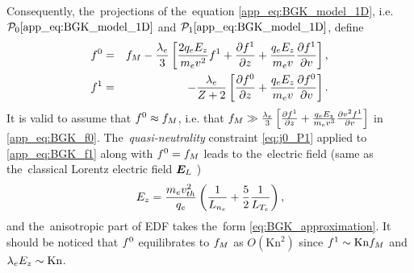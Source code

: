 Consequently, the~projections of the~equation \eqref{app_eq:BGK_model_1D}, 
i.e. $\mathcal{P}_0\eqref{app_eq:BGK_model_1D}$ 
and $\mathcal{P}_1\eqref{app_eq:BGK_model_1D}$, define 
\begin{eqnarray}
    f^0 &=& f_M - \frac{\lambda_e}{3}\left[\frac{2q_eE_z}{m_ev^2} f^1 
  + \frac{\partial{f^1}}{\partial{z}} + \frac{q_eE_z}{m_ev}\frac{\partial{f^1}}{\partial{v}}\right]
  ,
  \label{app_eq:BGK_f0} \\
  f^1 &=& - \frac{\lambda_e}{Z + 2}
  \left[ \frac{\partial{f^0}}{\partial{z}} + \frac{q_eE_z}{m_ev}\frac{\partial{f^0}}{\partial{v}} \right]
  . 
  \label{app_eq:BGK_f1}
\end{eqnarray}
It is valid to assume that $f^0 \approx f_M$, i.e. that $f_M \gg
\frac{\lambda_e}{3}\left[\frac{\partial{f^1}}{\partial{z}} +
\frac{q_eE_z}{m_ev^3}\frac{\partial{v^2f^1}}{\partial{v}}\right]$ 
in \eqref{app_eq:BGK_f0}. The~\textit{quasi-neutrality} constraint 
\eqref{eq:j0_P1} applied to \eqref{app_eq:BGK_f1} along with 
$f^0 = f_M$ leads to the~electric field 
(same as the~classical Lorentz electric field $\boldsymbol{E}_L$ \cite{Lorentz_1905})
\begin{equation}
  E_z = \frac{m_ev_{th}^2}{q_e}\left(\frac{1}{L_{n_e}} 
  + \frac{5}{2}\frac{1}{L_{T_e}} \right) 
  ,
  \label{app_eq:BGK_Efield}
\end{equation}
and the~anisotropic part of EDF takes the~form \eqref{eq:BGK_approximation}.
It should be noticed that $f^0$ equilibrates to $f_M$ 
as $O\left( \text{Kn}^2\right)$ since $f^1 \sim \text{Kn} f_M$ 
and $\lambda_e E_z \sim \text{Kn}$.

